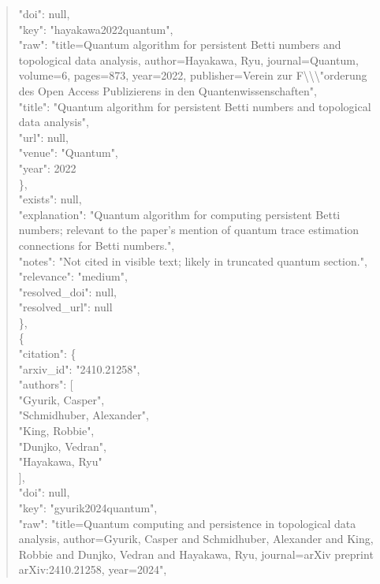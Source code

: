 \documentclass[11pt]{article}
\begin{document}
\begin{quote}
        "doi": null,\\
        "key": "hayakawa2022quantum",\\
        "raw": "title=Quantum algorithm for persistent Betti numbers and topological data analysis, author=Hayakawa, Ryu, journal=Quantum, volume=6, pages=873, year=2022, publisher=Verein zur F\textbackslash{}\textbackslash{}\textbackslash{}"orderung des Open Access Publizierens in den Quantenwissenschaften",\\
        "title": "Quantum algorithm for persistent Betti numbers and topological data analysis",\\
        "url": null,\\
        "venue": "Quantum",\\
        "year": 2022\\
      \},\\
      "exists": null,\\
      "explanation": "Quantum algorithm for computing persistent Betti numbers; relevant to the paper's mention of quantum trace estimation connections for Betti numbers.",\\
      "notes": "Not cited in visible text; likely in truncated quantum section.",\\
      "relevance": "medium",\\
      "resolved\_doi": null,\\
      "resolved\_url": null\\
    \},\\
    \{\\
      "citation": \{\\
        "arxiv\_id": "2410.21258",\\
        "authors": [\\
          "Gyurik, Casper",\\
          "Schmidhuber, Alexander",\\
          "King, Robbie",\\
          "Dunjko, Vedran",\\
          "Hayakawa, Ryu"\\
        ],\\
        "doi": null,\\
        "key": "gyurik2024quantum",\\
        "raw": "title=Quantum computing and persistence in topological data analysis, author=Gyurik, Casper and Schmidhuber, Alexander and King, Robbie and Dunjko, Vedran and Hayakawa, Ryu, journal=arXiv preprint arXiv:2410.21258, year=2024",\\

\end{quote}
\end{document}
